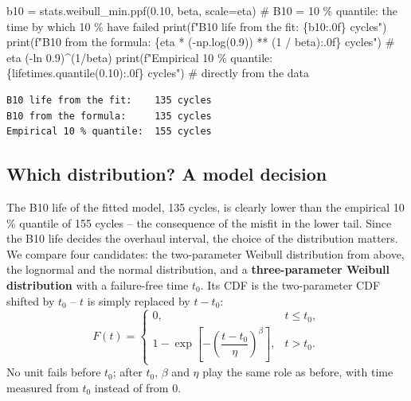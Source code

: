 \documentclass[
  letterpaper,
  DIV=11,
  numbers=noendperiod]{scrreprt}
\newenvironment{Shaded}{\begin{snugshade}}{\end{snugshade}}
\newcommand{\BuiltInTok}[1]{\textcolor[rgb]{0.00,0.23,0.31}{#1}}
\newcommand{\CommentTok}[1]{\textcolor[rgb]{0.37,0.37,0.37}{#1}}
\newcommand{\DecValTok}[1]{\textcolor[rgb]{0.68,0.00,0.00}{#1}}
\newcommand{\FloatTok}[1]{\textcolor[rgb]{0.68,0.00,0.00}{#1}}
\newcommand{\NormalTok}[1]{\textcolor[rgb]{0.00,0.23,0.31}{#1}}
\newcommand{\OperatorTok}[1]{\textcolor[rgb]{0.37,0.37,0.37}{#1}}
\newcommand{\SpecialCharTok}[1]{\textcolor[rgb]{0.37,0.37,0.37}{#1}}
\newcommand{\SpecialStringTok}[1]{\textcolor[rgb]{0.13,0.47,0.30}{#1}}
\begin{document}
\begin{Shaded}
\begin{Highlighting}[]
\NormalTok{b10 }\OperatorTok{=}\NormalTok{ stats.weibull\_min.ppf(}\FloatTok{0.10}\NormalTok{, beta, scale}\OperatorTok{=}\NormalTok{eta)   }\CommentTok{\# B10 = 10 \% quantile: the time by which 10 \% have failed}
\BuiltInTok{print}\NormalTok{(}\SpecialStringTok{f"B10 life from the fit:    }\SpecialCharTok{\{}\NormalTok{b10}\SpecialCharTok{:.0f\}}\SpecialStringTok{ cycles"}\NormalTok{)}
\BuiltInTok{print}\NormalTok{(}\SpecialStringTok{f"B10 from the formula:     }\SpecialCharTok{\{}\NormalTok{eta }\OperatorTok{*}\NormalTok{ (}\OperatorTok{{-}}\NormalTok{np.log(}\FloatTok{0.9}\NormalTok{)) }\OperatorTok{**}\NormalTok{ (}\DecValTok{1} \OperatorTok{/}\NormalTok{ beta)}\SpecialCharTok{:.0f\}}\SpecialStringTok{ cycles"}\NormalTok{)  }\CommentTok{\# eta ({-}ln 0.9)\^{}(1/beta)}
\BuiltInTok{print}\NormalTok{(}\SpecialStringTok{f"Empirical 10 \% quantile:  }\SpecialCharTok{\{}\NormalTok{lifetimes}\SpecialCharTok{.}\NormalTok{quantile(}\FloatTok{0.10}\NormalTok{)}\SpecialCharTok{:.0f\}}\SpecialStringTok{ cycles"}\NormalTok{)           }\CommentTok{\# directly from the data}
\end{Highlighting}
\end{Shaded}

\begin{verbatim}
B10 life from the fit:    135 cycles
B10 from the formula:     135 cycles
Empirical 10 % quantile:  155 cycles
\end{verbatim}

\subsection{Which distribution? A model
decision}\label{which-distribution-a-model-decision}

The B10 life of the fitted model, 135 cycles, is clearly lower than the
empirical 10 \% quantile of 155 cycles -- the consequence of the misfit
in the lower tail. Since the B10 life decides the overhaul interval, the
choice of the distribution matters. We compare four candidates: the
two-parameter Weibull distribution from above, the lognormal and the
normal distribution, and a \textbf{three-parameter Weibull distribution}
with a failure-free time \(t_0\). Its CDF is the two-parameter CDF
shifted by \(t_0\) -- \(t\) is simply replaced by \(t - t_0\):
\[F(t) = \begin{cases} 0, & t \le t_0, \\ 1 - \exp\left[-\left(\dfrac{t - t_0}{\eta}\right)^{\beta}\right], & t > t_0. \end{cases}\]
No unit fails before \(t_0\); after \(t_0\), \(\beta\) and \(\eta\) play
the same role as before, with time measured from \(t_0\) instead of from
0.
\end{document}

